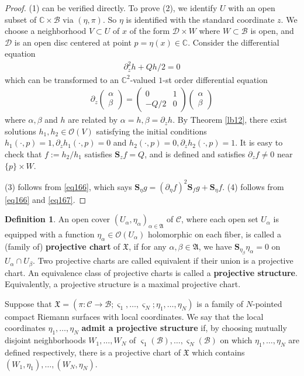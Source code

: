 \documentclass[12pt,b5paper,notitlepage]{report}
\theoremstyle{definition}
\newtheorem{df}{Definition}[section]
\theoremstyle{plain}
\newcommand{\fk}{\mathfrak}
\newcommand{\mc}{\mathcal}
\newcommand{\scr}{\mathscr}
\newcommand{\sgm}{\varsigma}
\newcommand{\Cbb}{\mathbb C}
\newcommand{\Sbf}{\mathbf{S}}
\numberwithin{equation}{section}
\begin{document}
\begin{proof}
(1) can be verified directly. To prove (2), we identify $U$ with an open subset of $\Cbb\times\mc B$ via $(\eta,\pi)$. So $\eta$ is identified with the standard coordinate $z$. We choose a neighborhood $V\subset U$ of $x$ of the form $\mc D\times W$ where $W\subset\mc B$ is open, and $\mc D$ is an open disc centered at point $p=\eta(x)\in\Cbb$. Consider the differential equation
\begin{align*}
\partial_z^2h+Qh/2=0
\end{align*}
which can be transformed to an $\Cbb^2$-valued $1$-st order differential equation
\begin{align*}
\partial_z
\begin{pmatrix}
\alpha\\
\beta
\end{pmatrix}
=
\begin{pmatrix}
0&1\\
-Q/2&0
\end{pmatrix}
\begin{pmatrix}
\alpha\\
\beta
\end{pmatrix}
\end{align*}
where $\alpha,\beta$ and $h$ are related by $\alpha=h,\beta=\partial_zh$. By Theorem \ref{lb12}, there exist solutions $h_1,h_2\in\scr O(V)$ satisfying  the initial conditions $h_1(\cdot,p)=1,\partial_z h_1(\cdot,p)=0$ and $h_2(\cdot,p)=0,\partial_z h_2(\cdot,p)=1$. It is easy to check that $f:=h_2/h_1$ satisfies $\Sbf_z f=Q$, and is defined and satisfies $\partial_zf\neq 0$ near $\{p\}\times W$.

(3) follows from \eqref{eq166}, which says $\Sbf_\eta g=(\partial_\eta f)^2\Sbf_fg+\Sbf_\eta f$. (4) follows from \eqref{eq166} and \eqref{eq167}.
\end{proof}


\begin{df}
An open cover $(U_\alpha,\eta_\alpha)_{\alpha\in\fk A}$ of $\mc C$, where each open set $U_\alpha$ is equipped with a function $\eta_\alpha\in\scr O(U_\alpha)$ holomorphic on each fiber, is called a (family of) \textbf{projective chart} of $\fk X$, if for any $\alpha,\beta\in\fk A$, we have $\Sbf_{\eta_\beta}\eta_\alpha=0$ on $U_\alpha\cap U_\beta$. Two projective charts are called equivalent if their union is a projective chart. An equivalence class of projective charts is called a \textbf{projective structure}. Equivalently, a projective structure is a maximal projective chart.

Suppose that $\fk X=(\pi:\mc C\rightarrow\mc B;\sgm_1,\dots,\sgm_N;\eta_1,\dots,\eta_N)$ is a family of $N$-pointed compact Riemann surfaces with local coordinates. We say that the local coordinates $\eta_1,\dots,\eta_N$ \textbf{admit a projective structure} if, by choosing mutually disjoint neighborhoods $W_1,\dots,W_N$ of $\sgm_1(\mc B),\dots,\sgm_N(\mc B)$ on which $\eta_1,\dots,\eta_N$ are defined respectively, there is a projective chart of $\fk X$ which contains $(W_1,\eta_1),\dots,(W_N,\eta_N)$.
\end{df}
\end{document}
